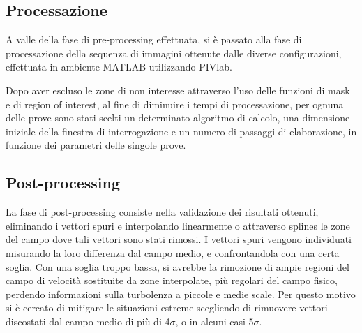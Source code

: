 \documentclass{article} %
\begin{document}
\subsection{Processazione}
A valle della fase di pre-processing effettuata, si è passato alla fase di processazione della sequenza di immagini ottenute dalle diverse configurazioni, effettuata in ambiente MATLAB utilizzando PIVlab.\par
Dopo aver escluso le zone di non interesse attraverso l'uso delle funzioni di mask e di region of interest, al fine di diminuire i tempi di processazione, per ognuna delle prove sono stati scelti un determinato algoritmo di calcolo, una dimensione iniziale della finestra di interrogazione e un numero di passaggi di elaborazione, in funzione dei parametri delle singole prove.\par
\subsection{Post-processing} 
La fase di post-processing consiste nella validazione dei risultati ottenuti, eliminando i vettori spuri e interpolando linearmente o attraverso splines le zone del campo dove tali vettori sono stati rimossi. I vettori spuri vengono individuati misurando la loro differenza dal campo medio, e confrontandola con una certa soglia. Con una soglia troppo bassa, si avrebbe la rimozione di ampie regioni del campo di velocità sostituite da zone interpolate, più regolari del campo fisico, perdendo informazioni sulla turbolenza a piccole e medie scale. Per questo motivo si è cercato di mitigare le situazioni estreme scegliendo di rimuovere vettori discostati dal campo medio di più di 4$\sigma$, o in alcuni casi 5$\sigma$.
 
\end{document}
